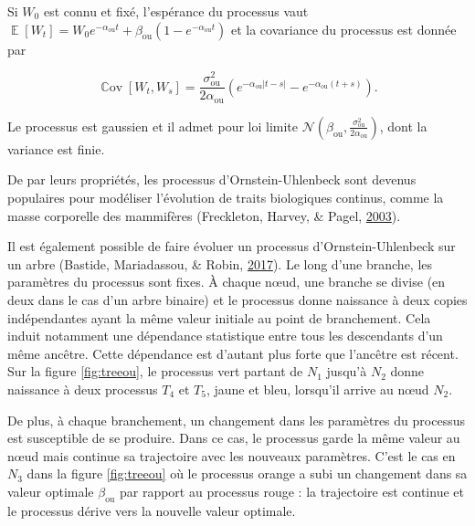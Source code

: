 \documentclass[12pt,a4paper]{reedthesis}
\DeclareMathOperator*{\esp}{\mathbb{E}}
\DeclareMathOperator*{\cov}{\mathbb{C}\text{ov}}
\newcommand \EE [1]{\esp\left[{#1}\right]}
\newcommand \CC [1]{\cov\left[{#1}\right]}
\newcommand \normal [2] {\mathcal{N}\left({#1},{#2}\right)}
\newcommand \ou [1]{{#1}_{\text{ou}}}
\newcommand \optim {\beta}
\theoremstyle{definition}
\theoremstyle{definition}
\theoremstyle{definition}
\theoremstyle{remark}
\begin{document}
Si \(W_0\) est connu et fixé, l'espérance du processus vaut \(\EE{W_t} = W_0 e^{-\ou{\alpha} t} + \ou{\optim}\left(1 - e^{-\ou{\alpha} t}\right)\) et la covariance du processus est donnée par

\[\CC{W_t, W_s} = \frac{\ou{\sigma}^2}{2\ou{\alpha}}\left(e^{-\ou{\alpha} \left|t-s\right|} - e^{-\ou{\alpha} \left(t+s\right)}\right).\]

Le processus est gaussien et il admet pour loi limite \(\normal{\ou{\optim}}{\frac{\ou{\sigma}^2}{2\ou{\alpha}}}\), dont la variance est finie.

De par leurs propriétés, les processus d'Ornstein-Uhlenbeck sont devenus populaires pour modéliser l'évolution de traits biologiques continus, comme la masse corporelle des mammifères (Freckleton, Harvey, \& Pagel, \protect\hyperlink{ref-freckleton2003bergmann}{2003}).

Il est également possible de faire évoluer un processus d'Ornstein-Uhlenbeck sur un
arbre (Bastide, Mariadassou, \& Robin, \protect\hyperlink{ref-bastide2017detection}{2017}). Le long d'une branche, les paramètres du processus sont fixes. À chaque nœud, une branche se divise (en deux dans le cas d'un arbre binaire) et le processus donne naissance à deux copies indépendantes ayant la même valeur initiale au point de branchement. Cela induit notamment une dépendance statistique entre tous les descendants d'un même ancêtre. Cette dépendance est d'autant plus forte que l'ancêtre est récent. Sur la figure \ref{fig:treeou}, le processus vert partant de \(N_1\) jusqu'à \(N_2\) donne naissance à deux processus \(T_4\) et \(T_5\), jaune et bleu, lorsqu'il arrive au nœud \(N_2\).

De plus, à chaque branchement, un changement dans les paramètres du processus est susceptible de se produire. Dans ce cas, le processus garde la même valeur au nœud mais continue sa trajectoire avec les nouveaux paramètres. C'est le cas en \(N_3\) dans la figure \ref{fig:treeou} où le processus orange a subi un changement dans sa valeur optimale \(\ou{\optim}\) par rapport au processus rouge : la trajectoire est continue et le processus dérive vers la nouvelle valeur optimale.
\end{document}
